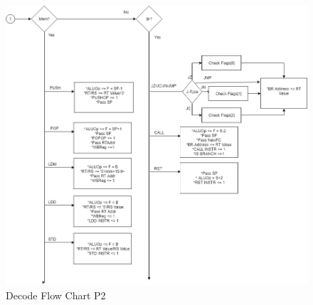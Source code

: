 \documentclass[12pt]{article}
\theoremstyle{plain}
\theoremstyle{definition}
\begin{document}
\begin{figure}
    \centering
    \includegraphics[width=\textwidth,height=\textheight,keepaspectratio]{Diagrams/decode_2.png}
    \caption{Decode Flow Chart P2}
    \label{decode-chart2}
\end{figure}
\end{document}
